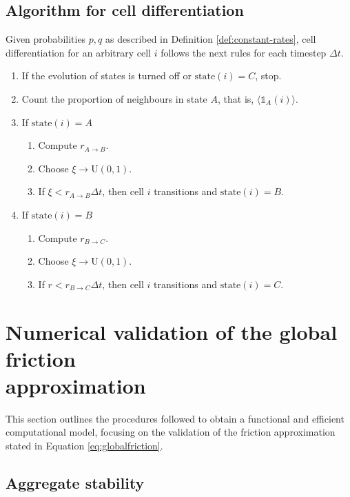 \subsection{Algorithm for cell differentiation}

Given probabilities $p,q$ as described in Definition \ref{def:constant-rates}, cell differentiation for an arbitrary cell $i$ follows the next rules for each timestep $\Delta t$.
\begin{enumerate}
    \item If the evolution of states is turned off or $\text{state}(i)=C$, stop.
    \item Count the proportion of neighbours in state $A$, that is, $\langle\mathds{1}_A(i)\rangle$.
    \item If $\text{state}(i)=A$
    \begin{enumerate}[label=\roman*.]
        \item Compute $r_{A\rightarrow B}$.
        \item Choose $\xi \rightarrow \text{U}(0,1)$.
        \item If $\xi < r_{A\rightarrow B}\Delta t$, then cell $i$ transitions and $\text{state}(i)=B$.
    \end{enumerate}
    \item If $\text{state}(i)=B$
    \begin{enumerate}[label=\roman*.]
        \item Compute $r_{B\rightarrow C}$.
        \item Choose $\xi \rightarrow \text{U}(0,1)$.
        \item If $r<r_{B\rightarrow C}\Delta t$, then cell $i$ transitions and $\text{state}(i)=C$.
    \end{enumerate}
\end{enumerate}



\section[Numerical validation of the global friction approximation]{Numerical validation of the global friction \\ approximation}

This section outlines the procedures followed to obtain a functional and efficient computational model, focusing on the validation of the friction approximation stated in Equation \ref{eq:globalfriction}.


\subsection{Aggregate stability}

